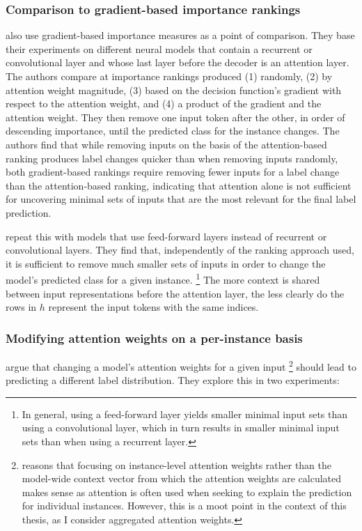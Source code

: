 \subsubsection{Comparison to gradient-based importance rankings}

\citet{serrano2019attention} also use gradient-based importance measures as a point of comparison.
They base their experiments on different neural models that contain a recurrent or convolutional layer and whose last layer before the decoder is an attention layer.
The authors compare at importance rankings produced (1) randomly, (2) by attention weight magnitude, (3) based on the decision function's gradient with respect to the attention weight, and (4) a product of the gradient and the attention weight.
They then remove one input token after the other, in order of descending importance, until the predicted class for the instance changes.
The authors find that while removing inputs on the basis of the attention-based ranking produces label changes quicker than when removing inputs randomly, both gradient-based rankings require removing fewer inputs for a label change than the attention-based ranking, indicating that attention alone is not sufficient for uncovering minimal sets of inputs that are the most relevant for the final label prediction.

\citeauthor{serrano2019attention} repeat this with models that use feed-forward layers instead of recurrent or convolutional layers.
They find that, independently of the ranking approach used, it is sufficient to remove much smaller sets of inputs in order to change the model's predicted class for a given instance.%
\footnote{In general, using a feed-forward layer yields smaller minimal input sets than using a convolutional layer, which in turn results in smaller minimal input sets than when using a recurrent layer.}
The more context is shared between input representations before the attention layer, the less clearly do the rows in $h$ represent the input tokens with the same indices.

\subsubsection{Modifying attention weights on a per-instance basis}

\citet{jain2019attentionNotExplanation} argue that changing a model's attention weights for a given input%
\footnote{\citet{wallace2019thoughts} reasons that focusing on instance-level attention weights rather than the model-wide context vector from which the attention weights are calculated makes sense as attention is often used when seeking to explain the prediction for individual instances.
However, this is a moot point in the context of this thesis, as I consider aggregated attention weights.}
should lead to predicting a different label distribution.
They explore this in two experiments:

